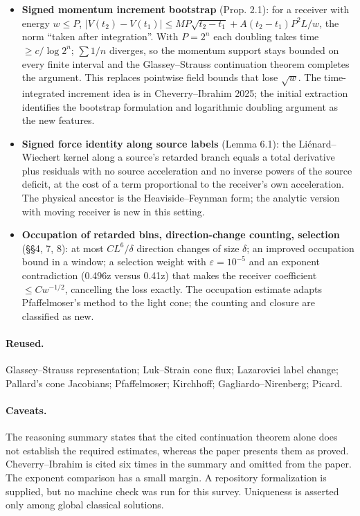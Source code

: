 \documentclass[11pt]{article}
\begin{document}
\begin{itemize}
\item \textbf{Signed momentum increment bootstrap} (Prop. 2.1): for a receiver with energy $w\le P$, $|V(t_2)-V(t_1)|\le MP\sqrt{t_2-t_1}+A(t_2-t_1)P^2L/w$, the norm ``taken after integration''. With $P=2^n$ each doubling takes time $\ge c/\log 2^n$; $\sum1/n$ diverges, so the momentum support stays bounded on every finite interval and the Glassey--Strauss continuation theorem completes the argument. This replaces pointwise field bounds that lose $\sqrt w$. The time-integrated increment idea is in Cheverry--Ibrahim 2025; the initial extraction identifies the bootstrap formulation and logarithmic doubling argument as the new features.
\item \textbf{Signed force identity along source labels} (Lemma 6.1): the Liénard--Wiechert kernel along a source's retarded branch equals a total derivative plus residuals with no source acceleration and no inverse powers of the source deficit, at the cost of a term proportional to the receiver's own acceleration. The physical ancestor is the Heaviside--Feynman form; the analytic version with moving receiver is new in this setting.
\item \textbf{Occupation of retarded bins, direction-change counting, selection} (\S{}\S{}4, 7, 8): at most $CL^6/\delta$ direction changes of size $\delta$; an improved occupation bound in a window; a selection weight with $\varepsilon=10^{-5}$ and an exponent contradiction (0.496z versus 0.41z) that makes the receiver coefficient $\le Cw^{-1/2}$, cancelling the loss exactly. The occupation estimate adapts Pfaffelmoser's method to the light cone; the counting and closure are classified as new.
\end{itemize}

\paragraph{Reused.}

Glassey--Strauss representation; Luk--Strain cone flux; Lazarovici label change; Pallard's cone Jacobians; Pfaffelmoser; Kirchhoff; Gagliardo--Nirenberg; Picard.

\paragraph{Caveats.}

The reasoning summary states that the cited continuation theorem alone does not establish the required estimates, whereas the paper presents them as proved. Cheverry--Ibrahim is cited six times in the summary and omitted from the paper. The exponent comparison has a small margin. A repository formalization is supplied, but no machine check was run for this survey. Uniqueness is asserted only among global classical solutions.
\end{document}
